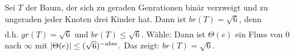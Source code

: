 \begin{beispiel}
	Sei $T$ der Baum, der sich zu geraden Genrationen binär verzweigt und zu ungeraden jeder Knoten drei Kinder hat. Dann ist $br(T) = \sqrt{6}$, denn
	\begin{align}
	\end{align}
	d.h. $gr(T) = \sqrt{6}$ und $br(T) \leq \sqrt{6}$.
	Wähle:
	Dann ist $\Theta(e)$ ein Fluss von $0$ nach $\infty$ mit $\lvert\Theta(e)\rvert \leq (\sqrt{6}) ^{-abs{e}}.$ Das zeigt: $br(T) = \sqrt{6}$.
\end{beispiel}













 
